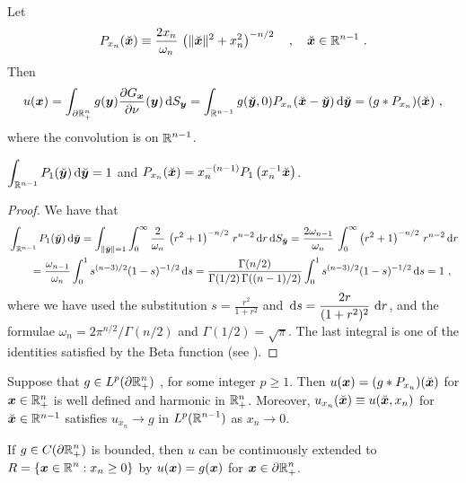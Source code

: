 Let
\[
P_{x_n}(\breve{{\bm{x}}}) \equiv \frac{2x_n}{\omega_n}\,
\left( \|\breve{{\bm{x}}}\|^2 + x_n^2 \right)^{-n/2} \quad , \quad
\breve{{\bm{x}}}\in \mathbb{R}^{n-1} \ .
\]
Then
\[
u({\bm{x}}) = \int_{\partial \mathbb{R}^n_+} g({\bm{y}})
\frac{\partial{G_{{\bm{x}}}}}{\partial \nu}({\bm{y}})\,\mathrm{d}{S}_{{\bm{y}}}
= \int_{\mathbb{R}^{n-1}} g(\breve{{\bm{y}}},0)
P_{x_n}(\breve{{\bm{x}}}-\breve{{\bm{y}}})
\,\mathrm{d}{\breve{{\bm{y}}}} = (g \ast P_{x_n})(\breve{{\bm{x}}}) \ ,
\]
where the convolution is on $\displaystyle \mathbb{R}^{n-1}$.

\begin{lemma} \label{laplace_lemma_diric}
$\displaystyle
\int_{\mathbb{R}^{n-1}} P_1(\breve{{\bm{y}}}) \,\mathrm{d}{\breve{{\bm{y}}}} = 1$ and
$\displaystyle P_{x_n}(\breve{{\bm{x}}}) = x_n^{-(n-1)}
P_1\left( x_n^{-1}\breve{{\bm{x}}}\right)$.
\end{lemma}

\begin{proof}
We have that
\begin{align*}
&\int_{\mathbb{R}^{n-1}} P_1(\breve{{\bm{y}}}) \,\mathrm{d}{\breve{{\bm{y}}}}
= \int_{\|\breve{{\bm{y}}}\|=1} \int_0^\infty 
\frac{2}{\omega_n}\,\left( r^2 + 1 \right)^{-n/2}\, r^{n-2}
\,\mathrm{d}{r}\,\mathrm{d}{S}_{\breve{{\bm{y}}}}
= \frac{2\omega_{n-1}}{\omega_n}\, \int_0^\infty 
\left( r^2 + 1 \right)^{-n/2}\, r^{n-2} \,\mathrm{d}{r} \\
&\qquad = \frac{\omega_{n-1}}{\omega_n} \int_0^1 s^{(n-3)/2} (1-s)^{-1/2} \,\mathrm{d}{s} 
= \frac{\Gamma(n/2)}{\Gamma(1/2)\,\Gamma((n-1)/2)}
\int_0^1 s^{(n-3)/2} (1-s)^{-1/2} \,\mathrm{d}{s} = 1 \ ,
\end{align*}
where we have used the substitution
$\displaystyle s = \frac{r^2}{1+r^2}$ and
$\displaystyle \,\mathrm{d}{s} = \frac{2r}{(1+r^2)^2}\, \,\mathrm{d}{r}$, and the
formulae $\displaystyle \omega_n = 2\pi^{n/2}/\Gamma(n/2)$ and
$\Gamma(1/2) = \sqrt{\pi}$.
The last integral is one of the identities satisfied by the Beta
function (see \cite{FoAC}).
\end{proof}

\begin{theorem} \label{laplace_half_plane_proof}
Suppose that $\displaystyle g \in L^p(\partial \mathbb{R}^n_+)$ \footnotemark,
for some integer $p\geq 1$.  Then
$u({\bm{x}}) = (g \ast P_{x_n})(\breve{{\bm{x}}})$ for
${\bm{x}} \in \mathbb{R}^n_+$ is well defined and harmonic in $\mathbb{R}^n_+$.
Moreover, $u_{x_n}(\breve{{\bm{x}}}) \equiv u(\breve{{\bm{x}}}, x_n)$ for
$\breve{{\bm{x}}} \in \mathbb{R}^{n-1}$ satisfies $u_{x_n} \rightarrow g$ in
$\displaystyle L^p(\mathbb{R}^{n-1})$ as $x_n \rightarrow 0$.

If $\displaystyle g\in C(\partial \mathbb{R}^n_+)$ is bounded, then $u$ can be
continuously extended to
$\displaystyle R = \{{\bm{x}}\in \mathbb{R}^n : x_n \geq 0\}$ by
$u({\bm{x}}) = g({\bm{x}})$ for $\displaystyle {\bm{x}} \in \partial \mathbb{R}^n_+$.
\end{theorem}

